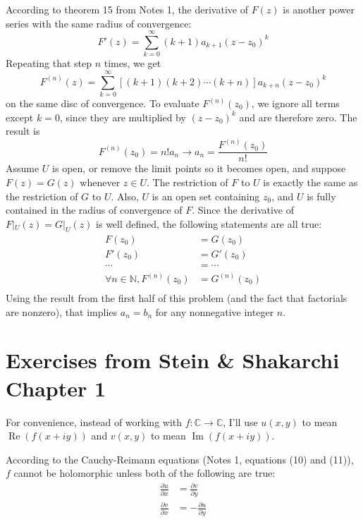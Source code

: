 \documentclass[12pt]{article}
\begin{document}
According to theorem 15 from Notes 1, the derivative of $F(z)$ is another power series with the same radius of convergence:
\[ F'(z) = \sum_{k=0}^\infty (k+1) a_{k+1} (z-z_0)^k \]
Repeating that step $n$ times, we get
\[ F^{(n)}(z) = \sum_{k=0}^\infty \left[ (k+1) (k+2) \cdots (k+n) \right] a_{k+n} (z-z_0)^k \]
on the same disc of convergence. To evaluate $F^{(n)}(z_0)$, we ignore all terms except $k=0$, since they are multiplied by $(z-z_0)^k$ and are therefore zero. The result is
\[ F^{(n)}(z_0) = n! a_n \rightarrow a_n = \frac{F^{(n)}(z_0)}{n!} \]
Assume $U$ is open, or remove the limit points so it becomes open, and suppose $F(z) = G(z)$ whenever $z \in U$. The restriction of $F$ to $U$ is exactly the same as the restriction of $G$ to $U$. Also, $U$ is an open set containing $z_0$, and $U$ is fully contained in the radius of convergence of $F$. Since the derivative of $F|_U(z)=G|_U(z)$ is well defined, the following statements are all true:
\begin{align*}
    F(z_0) &= G(z_0) \\
    F'(z_0) &= G'(z_0) \\
    \cdots &= \cdots \\
    \forall n \in \mathbb{N}, F^{(n)}(z_0) &= G^{(n)}(z_0) \\
\end{align*}
Using the result from the first half of this problem (and the fact that factorials are nonzero), that implies $a_n=b_n$ for any nonnegative integer $n$.

\section{Exercises from Stein \& Shakarchi Chapter 1}

\noindent{}\bigskip

For convenience, instead of working with $f : \mathbb{C} \rightarrow \mathbb{C}$, I'll use $u(x, y)$ to mean $\operatorname{Re}(f(x+iy))$ and $v(x, y)$ to mean $\operatorname{Im}(f(x+iy))$.
\par
According to the Cauchy-Reimann equations (Notes 1, equations (10) and (11)), $f$ cannot be holomorphic unless both of the following are true:
\begin{align*}
    \frac{\partial u}{\partial x} &= \frac{\partial v}{\partial y} \\
    \frac{\partial v}{\partial x} &= - \frac{\partial u}{\partial y}
\end{align*}
\end{document}
